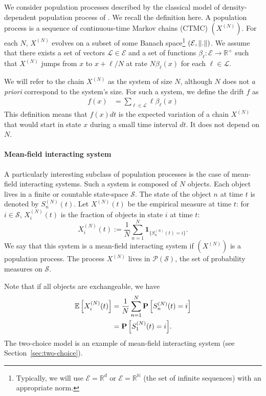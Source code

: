 \documentclass[sigconf]{acmart}
\newcommand\SN{S^{(N)}}
\newcommand\XN{X^{(N)}}
\newcommand\E{\mathcal{E}}
\newcommand\N{\mathbb{N}}
\newcommand\R{\mathbb{R}}
\newcommand\calL{\mathcal{L}}
\newcommand\calP{\mathcal{P}}
\newcommand\calS{\mathcal{S}}
\newcommand\esp[1]{{\mathchoice{\besp{#1}}{\sesp{#1}}{\sesp{#1}}{\sesp{#1}}}}
\newcommand\besp[1]{\mathbb{E}\left[#1\right]}
\newcommand\sesp[1]{\mathbb{E}[#1]}
\newcommand\Proba[1]{{\mathchoice{\bProba{#1}}{\sProba{#1}}{\sProba{#1}}{\sProba{#1}}}}
\newcommand\bProba[1]{\mathbf{P}\left[#1\right]}
\newcommand\sProba[1]{\mathbf{P}[#1]}
\newcommand\norm[1]{{\mathchoice{\bnorm{#1}}{\snorm{#1}}{\snorm{#1}}{\snorm{#1}}}}
\newcommand\bnorm[1]{\left\|#1\right\|}
\newcommand\snorm[1]{\|#1\|}
\newcommand\Ind[1]{\mathbf{1}_{\{#1\}}}
\begin{document}
We consider population processes described by the classical model of
density-dependent population process of
\cite{kurtz70,kurtz1978strong}. We recall the definition here. A
population process is a sequence of continuous-time Markov chains
(CTMC) $(\XN)$. For each $N$, $\XN$ evolves on a subset of some Banach
space\footnote{Typically, we will use $\E=\R^d$ or $\E=\R^{\N}$ (the
  set of infinite sequences) with an appropriate norm.}
$(\E,\norm{.})$. We assume that there exists a set of vectors
$\calL\in \E$ and a set of functions $\beta_\ell:\E\to\R^+$ such that
$\XN$ jumps from $x$ to $x+\ell/N$ at rate $N \beta_\ell(x)$ for each
$\ell\in\calL$.

We will refer to the chain $\XN$ as the system of size $N$, although
$N$ does not \emph{a priori} correspond to the system's size.  For
such a system, we define the drift $f$ as
\begin{align*}
  f(x) &= \sum_{\ell\in\calL}\ell\beta_\ell(x) 
\end{align*}
This definition means that $f(x)dt$ is the expected variation of a
chain $\XN$ that would start in state $x$ during a small time interval
$dt$. It does not depend on $N$. 



\paragraph*{Mean-field interacting system}
A particularly interesting subclass of population processes is the
case of mean-field interacting systems. Such a system is composed of $N$
objects. Each object lives in a finite or countable state-space
$\calS$. The state of the object $n$ at time $t$ is denoted by
$\SN_n(t)$. Let $\XN(t)$ be the empirical measure at time $t$: for
$i\in\calS$, $\XN_i(t)$ is the fraction of objects in state $i$ at
time $t$:
\begin{equation*}
  \XN_i(t) := \frac{1}{N}\sum_{n=1}^N \Ind{\SN_n(t)=i}.
\end{equation*}
We say that this system is a mean-field interacting system if $(\XN)$
is a population process.  The process $\XN$ lives in $\calP(\calS)$,
the set of probability measures on $\calS$.

Note that if all objects are exchangeable, we have
\begin{align}
  \esp{\XN_i(t)} &= \frac{1}{N} \sum_{n=1}^N \Proba{\SN_n(t)=i}\nonumber\\
  &=\Proba{\SN_1(t)=i}. \label{eq:symmetric}
\end{align}
The two-choice model is an example of mean-field interacting system
(see Section~\ref{sec:two-choice}).
\end{document}
